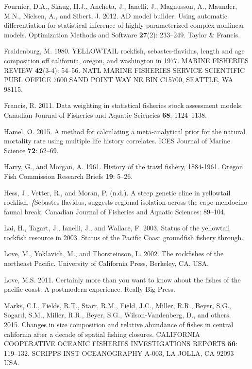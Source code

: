 \documentclass[12pt,]{article}
\begin{document}
\hypertarget{ref-Fournier2012}{}
Fournier, D.A., Skaug, H.J., Ancheta, J., Ianelli, J., Magnusson, A.,
Maunder, M.N., Nielsen, A., and Sibert, J. 2012. AD model builder: Using
automatic differentiation for statistical inference of highly
parameterized complex nonlinear models. Optimization Methods and
Software \textbf{27}(2): 233--249. Taylor \& Francis.

\hypertarget{ref-Fraidenburg1980}{}
Fraidenburg, M. 1980. YELLOWTAIL rockfish, sebastes-flavidus, length and
age composition off california, oregon, and washington in 1977. MARINE
FISHERIES REVIEW \textbf{42}(3-4): 54--56. NATL MARINE FISHERIES SERVICE
SCIENTIFIC PUBL OFFICE 7600 SAND POINT WAY NE BIN C15700, SEATTLE, WA
98115.

\hypertarget{ref-Francis2011}{}
Francis, R. 2011. Data weighting in statistical fisheries stock
assessment models. Canadian Journal of Fisheries and Aquatic Sciencies
\textbf{68}: 1124--1138.

\hypertarget{ref-Hamel2015}{}
Hamel, O. 2015. A method for calculating a meta-analytical prior for the
natural mortality rate using multiple life history correlates. ICES
Journal of Marine Science \textbf{72}: 62--69.

\hypertarget{ref-Harry1961}{}
Harry, G., and Morgan, A. 1961. History of the trawl fishery, 1884-1961.
Oregon Fish Commission Research Briefs \textbf{19}: 5--26.

\hypertarget{ref-Hess2011}{}
Hess, J., Vetter, R., and Moran, P. (n.d.). A steep genetic cline in
yellowtail rockfish, \emph{\{}Sebastes flavidus, suggests regional
isolation across the cape mendocino faunal break. Canadian Journal of
Fisheries and Aquatic Sciences: 89--104.

\hypertarget{ref-Lai2003}{}
Lai, H., Tagart, J., Ianelli, J., and Wallace, F. 2003. Status of the
yellowtail rockfish resource in 2003. Status of the Pacific Coast
groundfish fishery through.

\hypertarget{ref-Love2002}{}
Love, M., Yoklavich, M., and Thorsteinson, L. 2002. The rockfishes of
the northeast Pacific. University of California Press, Berkeley, CA,
USA.

\hypertarget{ref-Love2011}{}
Love, M.S. 2011. Certainly more than you want to know about the fishes
of the pacific coast: A postmodern experience. Really Big Press.

\hypertarget{ref-Marks2015}{}
Marks, C.I., Fields, R.T., Starr, R.M., Field, J.C., Miller, R.R.,
Beyer, S.G., Sogard, S.M., Miller, R.R., Beyer, S.G., Wilson-Vandenberg,
D., and others. 2015. Changes in size composition and relative abundance
of fishes in central california after a decade of spatial fishing
closures. CALIFORNIA COOPERATIVE OCEANIC FISHERIES INVESTIGATIONS
REPORTS \textbf{56}: 119--132. SCRIPPS INST OCEANOGRAPHY A-003, LA
JOLLA, CA 92093 USA.
\end{document}
